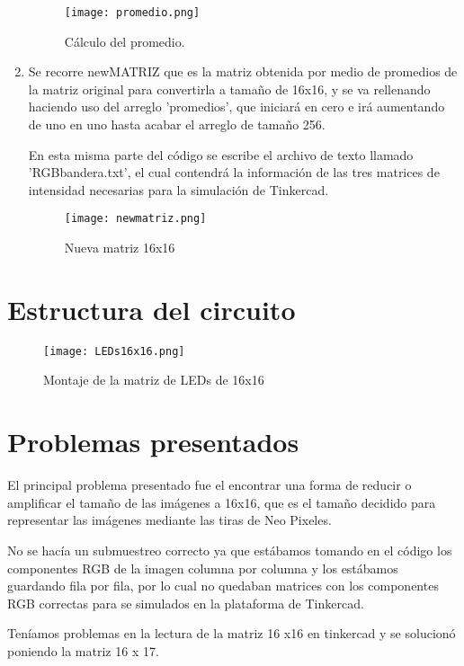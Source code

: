 \documentclass{article}
\begin{document}
\begin{enumerate}
\newpage
\begin{figure}[h]
\texttt{[image: promedio.png]}
\centering
\caption{Cálculo del promedio.}
\label{fig:promedio}
\end{figure}

\item Se recorre newMATRIZ que es la matriz obtenida por medio de promedios de la matriz original para convertirla a tamaño de 16x16, y se va rellenando haciendo uso del arreglo 'promedios', que iniciará en cero e irá aumentando de uno en uno hasta acabar el arreglo de tamaño 256.

En esta misma parte del código se escribe el archivo de texto llamado 'RGBbandera.txt', el cual contendrá la información de las tres matrices de intensidad necesarias para la simulación de Tinkercad.

\begin{figure}[h]
\texttt{[image: newmatriz.png]}
\centering
\caption{Nueva matriz 16x16}
\label{fig:nuevamatriz}
\end{figure}

\end{enumerate}

\newpage
\section{Estructura del circuito} \label{circuito}

\begin{figure}[h]
\texttt{[image: LEDs16x16.png]}
\centering
\caption{Montaje de la matriz de LEDs de 16x16}
\label{fig:montaje}
\end{figure}


\section{Problemas presentados} \label{problemas}
El principal problema presentado fue el encontrar una forma de reducir o amplificar el tamaño de las imágenes a 16x16, que es el tamaño decidido para representar las imágenes mediante las tiras de Neo Pixeles.

No se hacía un submuestreo correcto ya que estábamos tomando en el código los componentes RGB de la imagen columna por columna y los estábamos guardando fila por fila, por lo cual no quedaban matrices con los componentes RGB correctas para se simulados en la plataforma de Tinkercad.


Teníamos problemas en la lectura de la matriz 16 x16 en tinkercad y se solucionó poniendo la matriz 16 x 17.
\end{document}
